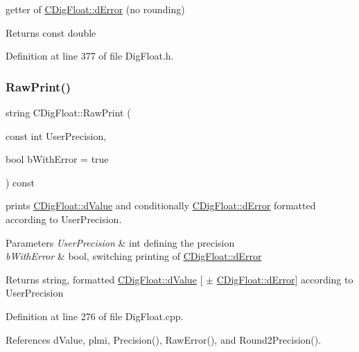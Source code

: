 getter of \hyperlink{classCDigFloat_a25eb3782d1e727ff007a48f8308e3d4d}{C\+Dig\+Float\+::d\+Error} (no rounding) 

\begin{DoxyReturn}{Returns}
const double 
\end{DoxyReturn}


Definition at line 377 of file Dig\+Float.\+h.

\mbox{\label{classCDigFloat_a7051716ffe1294bab6ed6e194a73618e}} 
\subsubsection{\texorpdfstring{Raw\+Print()}{RawPrint()}}
{\footnotesize\ttfamily string C\+Dig\+Float\+::\+Raw\+Print (\begin{DoxyParamCaption}\item[{const int}]{User\+Precision,  }\item[{bool}]{b\+With\+Error = {\ttfamily true} }\end{DoxyParamCaption}) const}



prints \hyperlink{classCDigFloat_a4bbe69e30dd4e20527362493aa9aaf96}{C\+Dig\+Float\+::d\+Value} and conditionally \hyperlink{classCDigFloat_a25eb3782d1e727ff007a48f8308e3d4d}{C\+Dig\+Float\+::d\+Error} formatted according to User\+Precision. 


\begin{DoxyParams}{Parameters}
{\em User\+Precision} & int defining the precision \\
\hline
{\em b\+With\+Error} & bool, switching printing of \hyperlink{classCDigFloat_a25eb3782d1e727ff007a48f8308e3d4d}{C\+Dig\+Float\+::d\+Error} \\
\hline
\end{DoxyParams}
\begin{DoxyReturn}{Returns}
string, formatted \hyperlink{classCDigFloat_a4bbe69e30dd4e20527362493aa9aaf96}{C\+Dig\+Float\+::d\+Value} \mbox{[} $\pm$ \hyperlink{classCDigFloat_a25eb3782d1e727ff007a48f8308e3d4d}{C\+Dig\+Float\+::d\+Error}\mbox{]} according to User\+Precision 
\end{DoxyReturn}


Definition at line 276 of file Dig\+Float.\+cpp.



References d\+Value, plmi, Precision(), Raw\+Error(), and Round2\+Precision().

